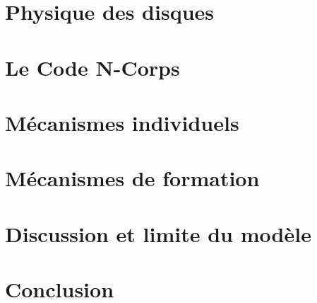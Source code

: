 \documentclass[logos,chaptertoc]{bordeaux-thesis}
\begin{document}






\chapter{Physique des disques}



\chapter{Le Code N-Corps}



\chapter{Mécanismes individuels}



\chapter{Mécanismes de formation}



\chapter{Discussion et limite du modèle}\label{sec:discussion}



\chapter*{Conclusion}



\appendix




\end{document}
